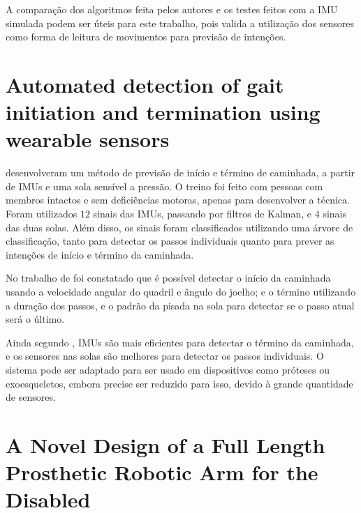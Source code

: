 A comparação dos algoritmos feita pelos autores  e os testes feitos com a IMU simulada podem ser úteis para este trabalho, pois valida a utilização dos sensores como forma de leitura de movimentos para previsão de intenções.


\section{Automated detection of gait initiation and termination using wearable sensors}
\label{sec:rel_novak}

 desenvolveram um método de previsão de início e término de caminhada, a partir de IMUs e uma sola sensível a pressão. O treino foi feito com pessoas com membros intactos e sem deficiências motoras, apenas para desenvolver a técnica. Foram utilizados $12$ sinais das IMUs, passando por filtros de Kalman, e $4$ sinais das duas solas. Além disso, os sinais foram classificados utilizando uma árvore de classificação, tanto para detectar os passos individuais quanto para prever as intenções de início e término da caminhada.

No trabalho de  foi constatado que é possível detectar o início da caminhada usando a velocidade angular do quadril e ângulo do joelho; e o término utilizando a duração dos passos, e o padrão da pisada na sola para detectar se o passo atual será o último.

Ainda segundo , IMUs são mais eficientes para detectar o término da caminhada, e os sensores nas solas são melhores para detectar os passos individuais. O sistema pode ser adaptado para ser usado em dispositivos como próteses ou exoesqueletos, embora precise ser reduzido para isso, devido à grande quantidade de sensores.


\section{A Novel Design of a Full Length Prosthetic Robotic Arm for the Disabled}
\label{sec:rel_kumar}

